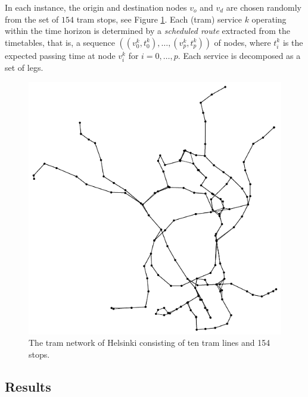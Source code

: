 \documentclass[dissertation,draft*]{aaltoseries}
\begin{document}
In each instance, the origin and destination nodes $v_o$ and $v_d$ are chosen randomly from the 
set of $154$ tram stops, see Figure \ref{verkot01}. 
Each (tram) service $k$ operating within the time horizon is determined by a \emph{scheduled route} extracted from the timetables, that is, 
a sequence $((v_0^k,t_0^k),\ldots,(v_p^k,t_p^k))$ of 
nodes, where $t_i^k$ is the expected passing time at node $v_i^k$ 
for $i=0,\ldots,p$. Each service is
decomposed as a set of legs.

\begin{figure}[ht]
\begin{center}
\includegraphics[width=0.7\columnwidth]{verkot01a}
\end{center}
\caption{The tram network of Helsinki consisting of ten tram lines and 154 stops. 
}
\label{verkot01}
\end{figure}


\subsection{Results}
\end{document}
